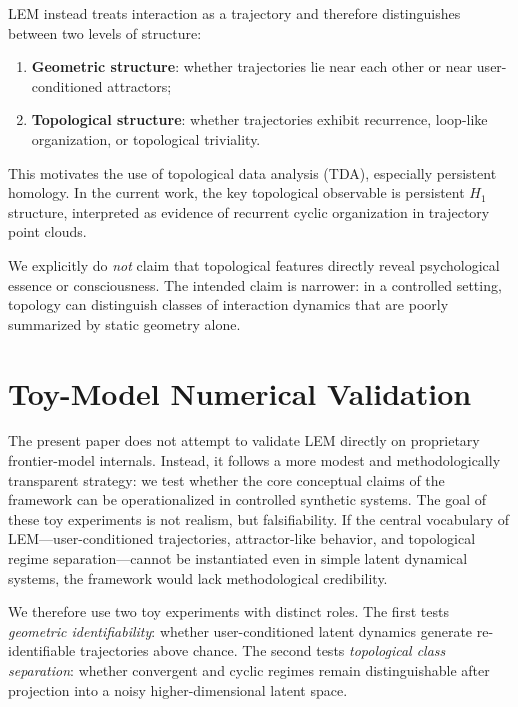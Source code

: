 \documentclass[11pt]{article}
\begin{document}
LEM instead treats interaction as a trajectory and therefore distinguishes between
two levels of structure:

\begin{enumerate}[leftmargin=1.8em]
  \item \textbf{Geometric structure}: whether trajectories lie near each other or
        near user-conditioned attractors;
  \item \textbf{Topological structure}: whether trajectories exhibit recurrence,
        loop-like organization, or topological triviality.
\end{enumerate}

This motivates the use of topological data analysis (TDA), especially persistent
homology. In the current work, the key topological observable is persistent $H_1$
structure, interpreted as evidence of recurrent cyclic organization in trajectory
point clouds.

We explicitly do \emph{not} claim that topological features directly reveal
psychological essence or consciousness. The intended claim is narrower: in a
controlled setting, topology can distinguish classes of interaction dynamics that
are poorly summarized by static geometry alone.


\section{Toy-Model Numerical Validation}

The present paper does not attempt to validate LEM directly on proprietary
frontier-model internals. Instead, it follows a more modest and methodologically
transparent strategy: we test whether the core conceptual claims of the framework
can be operationalized in controlled synthetic systems. The goal of these toy
experiments is not realism, but falsifiability. If the central vocabulary of
LEM---user-conditioned trajectories, attractor-like behavior, and topological
regime separation---cannot be instantiated even in simple latent dynamical systems,
the framework would lack methodological credibility.

We therefore use two toy experiments with distinct roles. The first tests
\emph{geometric identifiability}: whether user-conditioned latent dynamics generate
re-identifiable trajectories above chance. The second tests \emph{topological class
separation}: whether convergent and cyclic regimes remain distinguishable after
projection into a noisy higher-dimensional latent space.
\end{document}
